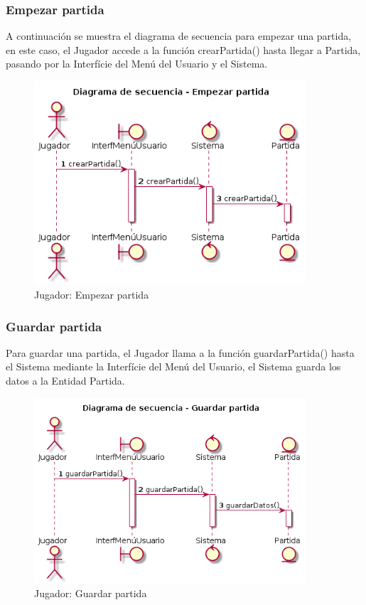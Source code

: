   
\newpage
\subsubsection{Empezar partida}
  A continuación se muestra el diagrama de secuencia para empezar una partida, en este caso, el Jugador accede a la función crearPartida() hasta llegar a Partida, pasando por la Interfície del Menú del Usuario y el Sistema.
  
  
\begin{figure}[ht]
 \centering
 	  \includegraphics[width=0.9\textwidth]{./imatges/jugador/Empezar_partida.png}
 \caption{Jugador: Empezar partida}
 \end{figure} 
  
  
\newpage
\subsubsection{Guardar partida}
  Para guardar una partida, el Jugador llama a la función guardarPartida() hasta el Sistema mediante la Interfície del Menú del Usuario, el Sistema guarda los datos a la Entidad Partida.

\begin{figure}[ht]
 \centering
 	  \includegraphics[width=0.9\textwidth]{./imatges/jugador/Guardar_partida.png}
 \caption{Jugador: Guardar partida}
 \end{figure} 

